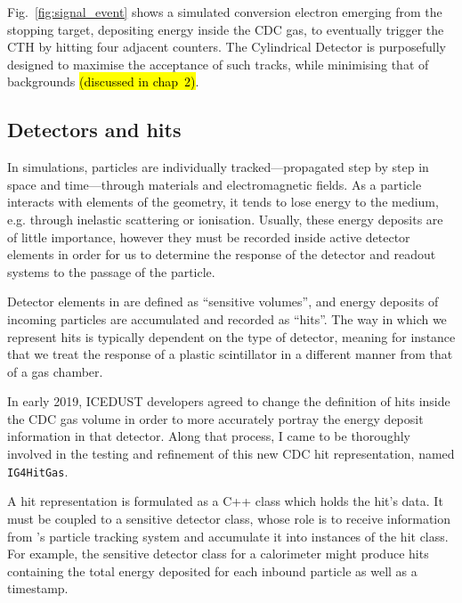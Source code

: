 Fig.~\ref{fig:signal_event} shows a simulated conversion electron emerging from the stopping target, depositing energy inside the CDC gas, to eventually trigger the CTH by hitting four adjacent counters. 
The Cylindrical Detector is purposefully designed to maximise the acceptance of such tracks, while minimising that of backgrounds \hl{(discussed in chap~2)}.%

\subsection{Detectors and hits}\label{subsec:SD}
In \Geant simulations, particles are individually tracked---propagated step by step in space and time---through materials and electromagnetic fields. 
As a particle interacts with elements of the geometry, it tends to lose energy to the medium, e.g. through inelastic scattering or ionisation. 
Usually, these energy deposits are of little importance, however they must be recorded inside active detector elements in order for us to determine the response of the detector and readout systems to the passage of the particle.


Detector elements in \Geant are defined as ``sensitive volumes'', and energy deposits of incoming particles are accumulated and recorded as ``hits''. 
The way in which we represent hits is typically dependent on the type of detector, meaning for instance that we treat the response of a plastic scintillator in a different manner from that of a gas chamber. %

In early 2019, ICEDUST developers agreed to change the definition of hits inside the CDC gas volume in order to more accurately portray the energy deposit information in that detector. Along that process, I came to be thoroughly involved in the testing and refinement of this new CDC hit representation, named \texttt{IG4HitGas}. 

A hit representation is formulated as a C++ class which holds the hit's data. It must be coupled to a sensitive detector class, whose role is to receive information from \Geant's particle tracking system and accumulate it into instances of the hit class. For example, the sensitive detector class for a calorimeter might produce hits containing the total energy deposited for each inbound particle as well as a timestamp.

